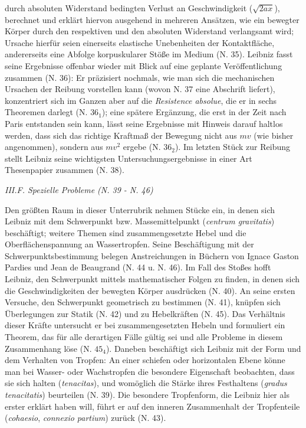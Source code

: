 durch absoluten Widerstand bedingten Verlust an Geschwindigkeit ($\sqrt{2ax}$), berechnet und erklärt hiervon ausgehend in mehreren Ansätzen, wie ein bewegter Körper durch den respektiven und den absoluten Widerstand verlangsamt wird; Ursache hierfür seien einerseits elastische Unebenheiten der Kontaktfläche, andererseits eine Abfolge korpuskularer Stö{\ss}e im Medium (N. 35). Leibniz fasst seine Ergebnisse offenbar wieder mit Blick auf eine geplante Veröffentlichung zusammen (N. 36): Er präzisiert nochmals, wie man sich die mechanischen Ursachen der Reibung vorstellen kann (wovon N. 37 eine Abschrift liefert), konzentriert sich im Ganzen aber auf die \textit{Resistence absolue}, die er in sechs Theoremen darlegt (N. $36_1$); eine spätere Ergänzung, die erst in der Zeit nach Paris entstanden sein kann, lässt seine Ergebnisse mit Hinweis darauf haltlos werden, dass sich das richtige Kraftma{\ss} der Bewegung nicht aus $mv$ (wie bisher angenommen), sondern aus $mv^{2}$ ergebe (N. $36_2$). Im letzten Stück zur Reibung stellt Leibniz seine wichtigsten Untersuchungsergebnisse in einer Art Thesenpapier zusammen (N. 38). 
\par
\par\vspace{2.0ex}
\noindent
\textit{III.F. Spezielle Probleme (N. 39 - N. 46)}
\par\noindent
Den grö{\ss}ten Raum in dieser Unterrubrik nehmen Stücke ein, in denen sich Leibniz mit dem Schwerpunkt bzw. Massemittelpunkt (\textit{centrum gravitatis}) beschäftigt; weitere Themen sind zusammengesetzte Hebel und die Oberflächenspannung an Wassertropfen. Seine Beschäftigung mit der Schwerpunktsbestimmung belegen Anstreichungen in Büchern von Ignace Gaston Pardies und Jean de Beaugrand (N. 44 u. N. 46). Im Fall des Sto{\ss}es hofft Leibniz, den Schwerpunkt mittels mathematischer Folgen zu finden, in denen sich die Geschwindigkeiten der bewegten Körper ausdrücken (N. 40). An seine ersten Versuche, den Schwerpunkt geometrisch zu bestimmen (N. 41), knüpfen sich Überlegungen zur Statik (N. 42) und zu Hebelkräften (N. 45). Das Verhältnis dieser Kräfte untersucht er bei zusammengesetzten Hebeln und formuliert ein Theorem, das für alle derartigen Fälle gültig sei und alle Probleme in diesem Zusammenhang löse (N. $45_4$). Daneben beschäftigt sich Leibniz mit der Form und dem Verhalten von Tropfen: An einer schiefen oder horizontalen Ebene könne man bei Wasser- oder Wachstropfen die besondere Eigenschaft beobachten, dass sie sich halten (\textit{tenacitas}), und womöglich die Stärke ihres Festhaltens (\textit{gradus tenacitatis}) beurteilen (N. 39). Die besondere Tropfenform, die Leibniz hier als erster erklärt haben will, führt er auf den inneren Zusammenhalt der Tropfenteile (\textit{cohaesio}, \textit{connexio partium}) zurück (N. 43). 
